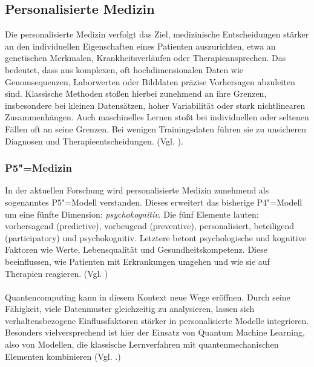 \subsection{Personalisierte Medizin}
Die personalisierte Medizin verfolgt das Ziel, medizinische Entscheidungen stärker an den individuellen Eigenschaften eines Patienten auszurichten, etwa an genetischen Merkmalen, Krankheitsverläufen oder Therapieansprechen. Das bedeutet, dass aus komplexen, oft hochdimensionalen Daten wie Genomsequenzen, Laborwerten oder Bilddaten präzise Vorhersagen abzuleiten sind. Klassische Methoden stoßen hierbei zunehmend an ihre Grenzen, insbesondere bei kleinen Datensätzen, hoher Variabilität oder stark nichtlinearen Zusammenhängen. Auch maschinelles Lernen stoßt bei individuellen oder seltenen Fällen oft an seine Grenzen. Bei wenigen Trainingsdaten führen sie zu unsicheren Diagnosen und Therapieentscheidungen. (Vgl. \cite{gupta_systematic_2025}).

\subsubsection*{P5"=Medizin}
In der aktuellen Forschung wird personalisierte Medizin zunehmend als sogenanntes P5"=Modell verstanden. Dieses erweitert das bisherige P4"=Modell um eine fünfte Dimension: \textit{psychokognitiv}. Die fünf Elemente lauten: vorhersagend (predictive), vorbeugend (preventive), personalisiert, beteiligend (participatory) und psychokognitiv. Letztere betont psychologische und kognitive Faktoren wie Werte, Lebensqualität und Gesundheitskompetenz. Diese beeinflussen, wie Patienten mit Erkrankungen umgehen und wie sie auf Therapien reagieren. (Vgl. \cite{gorini_p5_2011})\\
\\
Quantencomputing kann in diesem Kontext neue Wege eröffnen. Durch seine Fähigkeit, viele Datenmuster gleichzeitig zu analysieren, lassen sich verhaltensbezogene Einflussfaktoren stärker in personalisierte Modelle integrieren. Besonders vielversprechend ist hier der Einsatz von Quantum Machine Learning, also von Modellen, die klassische Lernverfahren mit quantenmechanischen Elementen kombinieren (Vgl. \cite{bertl_quantum_2025}.)

